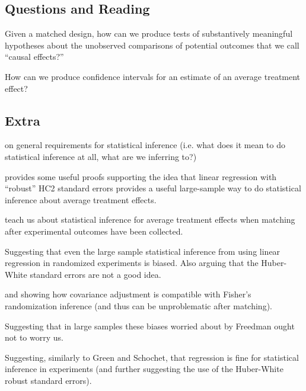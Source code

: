 \documentclass[10pt,letterpaper]{article}
\begin{document}
\subsection{Questions and Reading}

Given a matched design, how can we produce tests of substantively meaningful
hypotheses about the unobserved comparisons of potential outcomes that we call
``causal effects?''


How can we produce  confidence intervals for an estimate of an average
treatment effect?



\subsection{Extra}

 on general requirements for statistical
inference (i.e. what does it mean to do statistical inference at all, what are
we inferring to?)


 provides some useful proofs supporting the idea
that linear regression with ``robust'' HC2 standard errors provides a
useful large-sample way to do statistical inference about average
treatment effects.

 teach us about statistical inference for average
treatment effects when matching after experimental outcomes have been
collected.

Suggesting that even the large sample statistical inference from using
linear regression in randomized experiments is biased. Also arguing
that the Huber-White standard errors are not a good idea.

 and  showing how
covariance adjustment is compatible with Fisher's randomization
inference (and thus can be unproblematic after matching).

 Suggesting that in large
samples these biases worried about by Freedman ought not to worry
us. 

 Suggesting, similarly to Green and
Schochet, that regression is fine for statistical inference in
experiments (and further suggesting the use of the Huber-White robust
standard errors).
\end{document}
